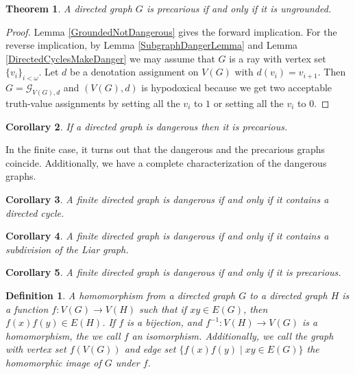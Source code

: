 \documentclass[12pt]{article}
\newtheorem{thm}{Theorem}
\newtheorem{cor}[thm]{Corollary}
\newtheorem{defn}{Definition}
\theoremstyle{remark}
\newcommand{\fancy}[1]{\mathcal{#1}}
\def\G{\fancy{G}}
\begin{document}
\begin{thm}\label{PrecariousCharacterization}
A directed graph $G$ is precarious if and only if it is ungrounded.
\end{thm}
\begin{proof}
Lemma \ref{GroundedNotDangerous} gives the forward implication.  For the reverse implication, by Lemma \ref{SubgraphDangerLemma} and Lemma \ref{DirectedCyclesMakeDanger} we may assume that $G$ is a ray with vertex set $\{v_i\}_{i < \omega}$.  Let $d$ be a denotation assignment on $V(G)$ with $d(v_i) = v_{i+1}$.  Then $G = \G_{V(G), d}$ and $(V(G), d)$ is hypodoxical because we get two acceptable truth-value assignments by setting all the $v_i$ to $1$ or setting all the $v_i$ to $0$.
\end{proof}

\begin{cor}
If a directed graph is dangerous then it is precarious.
\end{cor}

In the finite case, it turns out that the dangerous and the precarious graphs coincide. Additionally, we have a complete characterization of the dangerous graphs.
\begin{cor}\label{FiniteCharacterization}
A finite directed graph is dangerous if and only if it contains a directed cycle.
\end{cor}

\begin{cor}\label{FiniteIsSubdividedLiar}
A finite directed graph is dangerous if and only if it contains a subdivision of the Liar graph.
\end{cor}

\begin{cor}
A finite directed graph is dangerous if and only if it is precarious.
\end{cor}

\begin{defn}
A \emph{homomorphism} from a directed graph $G$ to a directed graph $H$ is a function $f:V(G) \rightarrow V(H)$ such that if $xy \in E(G)$, then $f(x)f(y) \in E(H)$.   If $f$ is a bijection, and $f^{-1}: V(H) \rightarrow V(G)$ is a homomorphism, the we call $f$ an \emph{isomorphism}.  Additionally, we call the graph with vertex set $f(V(G))$ and edge set $\{f(x)f(y) \mid xy \in E(G)\}$ the \emph{homomorphic image} of $G$ under $f$.
\end{defn}
\end{document}
